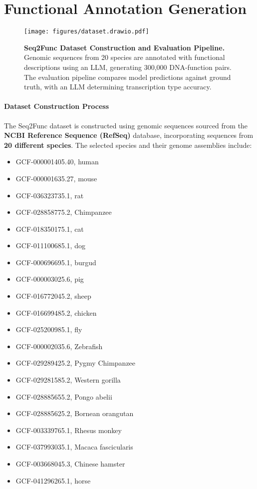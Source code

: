 \newpage
\section{Functional Annotation Generation}
\label{app:dna2func}
 \begin{figure*}[ht!]
    \centering
    \texttt{[image: figures/dataset.drawio.pdf]}
    \vspace{-2em} %
    \caption{\textbf{Seq2Func Dataset Construction and Evaluation Pipeline.} Genomic sequences from 20 species are annotated with functional descriptions using an LLM, generating 300,000 DNA-function pairs. The evaluation pipeline compares model predictions against ground truth, with an LLM determining transcription type accuracy.}
    \label{fig:seq2func}
\end{figure*}


\paragraph{Dataset Construction Process}

The Seq2Func dataset is constructed using genomic sequences sourced from the \textbf{NCBI Reference Sequence (RefSeq)} database, incorporating sequences from \textbf{20 different species}. The selected species and their genome assemblies include:

\begin{itemize}
\item GCF-000001405.40, human
\item GCF-000001635.27, mouse
\item GCF-036323735.1, rat
\item GCF-028858775.2, Chimpanzee
\item GCF-018350175.1, cat
\item GCF-011100685.1, dog
\item GCF-000696695.1, burgud
\item GCF-000003025.6, pig
\item GCF-016772045.2, sheep
\item GCF-016699485.2, chicken
\item GCF-025200985.1, fly
\item GCF-000002035.6, Zebrafish
\item GCF-029289425.2, Pygmy Chimpanzee
\item GCF-029281585.2, Western gorilla
\item GCF-028885655.2, Pongo abelii
\item GCF-028885625.2, Bornean orangutan
\item GCF-003339765.1, Rhesus monkey
\item GCF-037993035.1, Macaca fascicularis
\item GCF-003668045.3, Chinese hamster
\item GCF-041296265.1, horse
\end{itemize}

